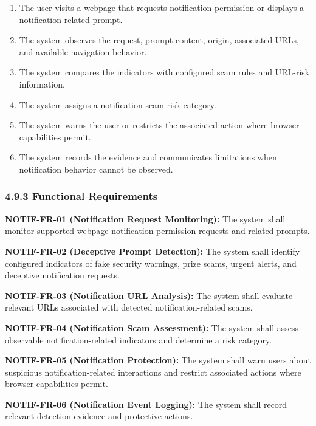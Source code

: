 \documentclass[12pt,a4paper]{report}
\begin{document}
\begin{enumerate}
\item The user visits a webpage that requests notification permission or displays a notification-related prompt.
\item The system observes the request, prompt content, origin, associated URLs, and available navigation behavior.
\item The system compares the indicators with configured scam rules and URL-risk information.
\item The system assigns a notification-scam risk category.
\item The system warns the user or restricts the associated action where browser capabilities permit.
\item The system records the evidence and communicates limitations when notification behavior cannot be observed.
\end{enumerate}

\subsubsection*{4.9.3 Functional Requirements}

\textbf{NOTIF-FR-01 (Notification Request Monitoring):} The system shall monitor supported webpage notification-permission requests and related prompts.\par

\textbf{NOTIF-FR-02 (Deceptive Prompt Detection):} The system shall identify configured indicators of fake security warnings, prize scams, urgent alerts, and deceptive notification requests.\par

\textbf{NOTIF-FR-03 (Notification URL Analysis):} The system shall evaluate relevant URLs associated with detected notification-related scams.\par

\textbf{NOTIF-FR-04 (Notification Scam Assessment):} The system shall assess observable notification-related indicators and determine a risk category.\par

\textbf{NOTIF-FR-05 (Notification Protection):} The system shall warn users about suspicious notification-related interactions and restrict associated actions where browser capabilities permit.\par

\textbf{NOTIF-FR-06 (Notification Event Logging):} The system shall record relevant detection evidence and protective actions.\par
\end{document}
